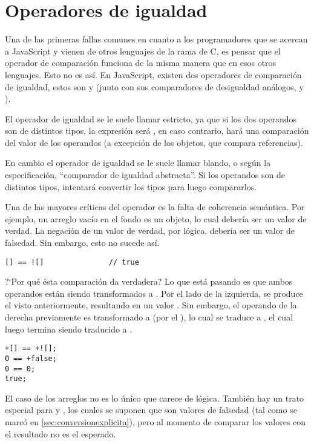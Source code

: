 \section{Operadores de igualdad}
\label{sec:eqeqeq}

Una de las primeras fallas comunes en cuanto a los programadores que se acercan a JavaScript y vienen de otros lenguajes de la rama de C, es pensar que el operador de comparación \code{==} funciona de la misma manera que en esos otros lenguajes. Esto no es así. En JavaScript, existen dos operadores de comparación de igualdad, estos son \code{==} y \code{===} (junto con sus comparadores de desigualdad análogos, \code{!=} y \code{!==}).

El operador de igualdad \code{===} se le suele llamar estricto, ya que si los dos operandos son de distintos tipos, la expresión será , en caso contrario, hará una comparación del valor de los operandos (a excepción de los objetos, que compara referencias).

En cambio el operador de igualdad \code{==} se le suele llamar blando, o según la especificación, "`comparador de igualdad abstracta"'. Si los operandos son de distintos tipos, intentará convertir los tipos para luego compararlos.

Una de las mayores críticas del operador \code{==} es la falta de coherencia semántica. Por ejemplo, un arreglo vacío \code{[]} en el fondo es un objeto, lo cual debería ser un valor de verdad. La negación de un valor de verdad, por lógica, debería ser un valor de falsedad. Sin embargo, esto no sucede así.

\begin{lstlisting}[title={Comparando un \code{Array} con su negación}]
[] == ![] 				// true
\end{lstlisting}

?`Por qué ésta comparación da verdadera? Lo que está pasando es que ambos operandos están siendo transformados a . Por el lado de la izquierda, se produce el  visto anteriormente, resultando en un valor . Sin embargo, el operando de la derecha previamente es transformado a  (por el ), lo cual se traduce a , el cual luego termina siendo traducido a .

\begin{lstlisting}
+[] == +![];
0 == +false;
0 == 0;
true;
\end{lstlisting}

El caso de los arreglos no es lo único que carece de lógica. También hay un trato especial para  y , los cuales se suponen que son valores de falsedad (tal como se marcó en \ref{sec:conversionexplicita}), pero al momento de comparar los valores con  el resultado no es el esperado.

